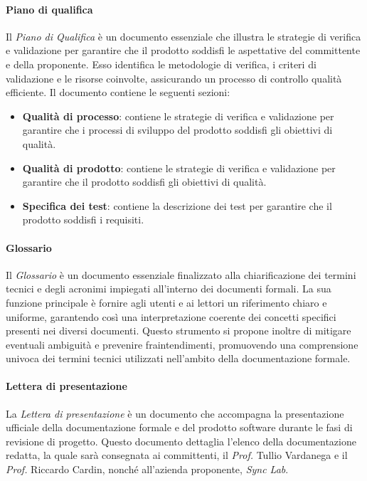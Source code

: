 \paragraph{Piano di qualifica}
Il \textit{Piano di Qualifica} è un documento essenziale che illustra le strategie di verifica e validazione per garantire che il prodotto soddisfi le aspettative del committente e della proponente. Esso identifica le metodologie di verifica, i criteri di validazione e le risorse coinvolte, assicurando un processo di controllo qualità efficiente.
Il documento contiene le seguenti sezioni:
\begin{itemize}
    \item \textbf{Qualità di processo}: contiene le strategie di verifica e validazione per garantire che i processi di sviluppo del prodotto soddisfi gli obiettivi di qualità.
    \item \textbf{Qualità di prodotto}: contiene le strategie di verifica e validazione per garantire che il prodotto soddisfi gli obiettivi di qualità.
    \item \textbf{Specifica dei test}: contiene la descrizione dei test per garantire che il prodotto soddisfi i requisiti. 
\end{itemize}

\paragraph{Glossario}
Il \textit{Glossario} è un documento essenziale finalizzato alla chiarificazione dei termini tecnici e degli acronimi impiegati all'interno dei documenti formali. La sua funzione principale è fornire agli utenti e ai lettori un riferimento chiaro e uniforme, garantendo così una interpretazione coerente dei concetti specifici presenti nei diversi documenti. Questo strumento si propone inoltre di mitigare eventuali ambiguità e prevenire fraintendimenti, promuovendo una comprensione univoca dei termini tecnici utilizzati nell'ambito della documentazione formale.

\paragraph{Lettera di presentazione}
La \textit{Lettera di presentazione} è un documento che accompagna la presentazione ufficiale della documentazione formale e del prodotto software durante le fasi di revisione di progetto. Questo documento dettaglia l'elenco della documentazione redatta, la quale sarà consegnata ai committenti, il \textit{Prof.} Tullio Vardanega e il \textit{Prof.} Riccardo Cardin, nonché all'azienda proponente, \textit{Sync Lab}.

